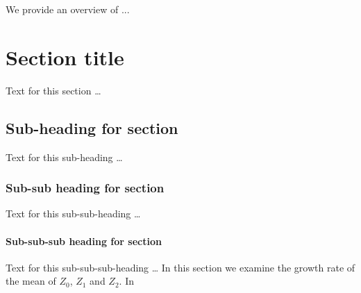 \documentclass[twocolumn]{bmcart}%
\begin{document}
We provide an overview of ...



\section*{Section title}
Text for this section \ldots
\subsection*{Sub-heading for section}
Text for this sub-heading \ldots
\subsubsection*{Sub-sub heading for section}
Text for this sub-sub-heading \ldots
\paragraph*{Sub-sub-sub heading for section}
Text for this sub-sub-sub-heading \ldots
In this section we examine the growth rate of the mean of $Z_0$, $Z_1$ and $Z_2$. In


\end{document}
